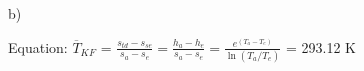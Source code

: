 b)  

Equation:  
\( \overline{T}_{KF} \) = \( \frac{s_{td} - s_{se}}{s_{a} - s_{e}} = \frac{h_{a} - h_{e}}{s_{a} - s_{e}} = \frac{e^{(T_a - T_e)}}{\ln(T_a / T_e)} \) = 293.12 K